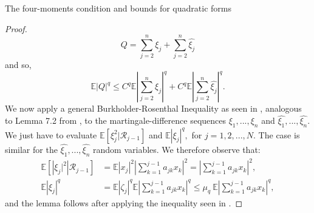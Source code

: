 \documentclass[11pt, a4paper, oneside]{book}
\numberwithin{equation}{chapter}
\newcommand{\E}{\mathbb E}
\newcommand{\beq}{\begin{equation}}
\newcommand{\eeq}{\end{equation}}
\begin{document}
\begin{section}{The four-moments condition and bounds for quadratic forms}
\begin{proof}
%
\beq
Q = \sum \limits_{j=2}^{n} \xi_j + \sum \limits_{j=2}^n \widehat{\xi_j}
\eeq
%
and so,
%
$$ \E |Q|^q \leq C^q \E \left | \sum \limits_{j=2}^n \xi_j \right |^q + C^q \E \left | \sum \limits_{j=2}^n \widehat{\xi_j} \right |^q .$$
%
We now apply a general Burkholder-Rosenthal Inequality as seen in \cite{osekowski2012note}, analogous to Lemma 7.2 from \cite{gotze2016optimal},  to the martingale-difference sequences $\xi_1,...,\xi_n$ and $\widehat{\xi_1},..., \widehat{\xi_n}.$ We just have to evaluate $\E[ \xi_j^2 | \mathcal{R}_{j-1} ]$ and $\E |\xi_j |^q ,$ for $j=1,2,...,N.$ The case is similar for the $\widehat{\xi_1},..., \widehat{\xi_n} $ random variables. We therefore observe that:
%
\begin{align*}
\E \left [ \left | \xi_j|^2 \right | \mathcal{R}_{j-1} \right ] &= \E|x_j|^2  \left | \sum \limits_{k=1}^{j-1} a_{jk} x_k \right |^2 = \left | \sum \limits_{k=1}^{j-1} a_{jk} x_k \right |^2, \\
\E | \xi_j |^q &= \E | \zeta_j|^q \E \left | \sum \limits_{k=1}^{j-1} a_{jk} x_k \right |^q \leq \mu_{q} \ \E \left | \sum \limits_{k=1}^{j-1} a_{jk} x_k \right |^q,
\end{align*}
%
and the lemma follows after applying the inequality seen in \cite{osekowski2012note}.
\end{proof}
%
\end{section}
\end{document}
